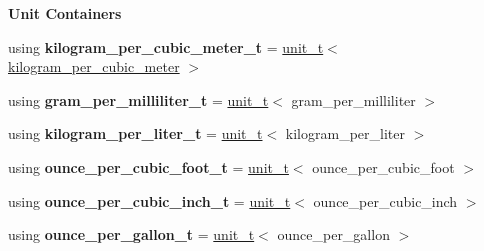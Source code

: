 \begin{Indent}{\bf Unit Containers}\par
{\em \label{namespaceunits_1_1density_densityContainers}%
\hypertarget{namespaceunits_1_1density_densityContainers}{}%
}\begin{DoxyCompactItemize}
\item 
\hypertarget{namespaceunits_1_1density_a0ebabe6474c087c193e3de679dd0e346}{}using {\bfseries kilogram\+\_\+per\+\_\+cubic\+\_\+meter\+\_\+t} = \hyperlink{classunits_1_1unit__t}{unit\+\_\+t}$<$ \hyperlink{structunits_1_1unit}{kilogram\+\_\+per\+\_\+cubic\+\_\+meter} $>$\label{namespaceunits_1_1density_a0ebabe6474c087c193e3de679dd0e346}

\item 
\hypertarget{namespaceunits_1_1density_a39443ab3ffe932627a1645f240e147a7}{}using {\bfseries gram\+\_\+per\+\_\+milliliter\+\_\+t} = \hyperlink{classunits_1_1unit__t}{unit\+\_\+t}$<$ gram\+\_\+per\+\_\+milliliter $>$\label{namespaceunits_1_1density_a39443ab3ffe932627a1645f240e147a7}

\item 
\hypertarget{namespaceunits_1_1density_a1457c5043ab3f8a8a0abf8f74f6d5153}{}using {\bfseries kilogram\+\_\+per\+\_\+liter\+\_\+t} = \hyperlink{classunits_1_1unit__t}{unit\+\_\+t}$<$ kilogram\+\_\+per\+\_\+liter $>$\label{namespaceunits_1_1density_a1457c5043ab3f8a8a0abf8f74f6d5153}

\item 
\hypertarget{namespaceunits_1_1density_a233a154c80d34af4bc32cf382ade6f5d}{}using {\bfseries ounce\+\_\+per\+\_\+cubic\+\_\+foot\+\_\+t} = \hyperlink{classunits_1_1unit__t}{unit\+\_\+t}$<$ ounce\+\_\+per\+\_\+cubic\+\_\+foot $>$\label{namespaceunits_1_1density_a233a154c80d34af4bc32cf382ade6f5d}

\item 
\hypertarget{namespaceunits_1_1density_a19b2f2d7bc89ca24f3bbbd6538e5e81f}{}using {\bfseries ounce\+\_\+per\+\_\+cubic\+\_\+inch\+\_\+t} = \hyperlink{classunits_1_1unit__t}{unit\+\_\+t}$<$ ounce\+\_\+per\+\_\+cubic\+\_\+inch $>$\label{namespaceunits_1_1density_a19b2f2d7bc89ca24f3bbbd6538e5e81f}

\item 
\hypertarget{namespaceunits_1_1density_a3d87d242054590252539a5bffe76ac9c}{}using {\bfseries ounce\+\_\+per\+\_\+gallon\+\_\+t} = \hyperlink{classunits_1_1unit__t}{unit\+\_\+t}$<$ ounce\+\_\+per\+\_\+gallon $>$\label{namespaceunits_1_1density_a3d87d242054590252539a5bffe76ac9c}


\end{DoxyCompactItemize}
\end{Indent}
